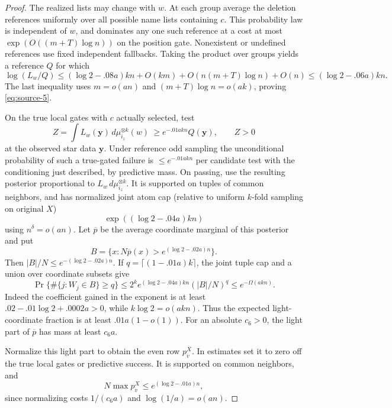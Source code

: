 \begin{proof}
The realized lists may change with \(w\). At each group average the deletion references uniformly over all possible name lists containing \(c\). This probability law is independent of \(w\), and dominates any one such reference at a cost at most \(\exp(O((m+T)\log n))\) on the position gate. Nonexistent or undefined references use fixed independent fallbacks. Taking the product over groups yields a reference \(Q\) for which
\[
 \log(L_w/Q)\le(\log2-.08a)kn
       +O(km)+O(n(m+T)\log n)+O(n)
       \le(\log2-.06a)kn.
\]
The last inequality uses \(m=o(an)\) and \((m+T)\log n=o(ak)\), proving \eqref{eq:source-5}.

On the true local gates with \(c\) actually selected, test
\[
 Z=\int L_w(\boldsymbol y)\,d\mu_{i_z}^{\otimes k}(w)\ \ge e^{-.01 a k n}Q(\boldsymbol y),\qquad Z>0
\]
at the observed star data \(\boldsymbol y\). Under reference odd sampling the unconditional probability of such a true-gated failure is \(\le e^{-.01 a k n}\) per candidate test with the conditioning just described, by predictive mass. On passing, use the resulting posterior proportional to \(L_w\,d\mu_{i_z}^{\otimes k}\). It is supported on tuples of common neighbors, and has normalized joint atom cap (relative to uniform \(k\)-fold sampling on original \(X\))
\[
 \exp((\log 2-.04a)kn)
\]
using \(n^\delta=o(an)\). Let \(\overline p\) be the average coordinate marginal of this posterior and put
\[
 B=\{x:N\overline p(x)>e^{(\log2-.02a)n}\}.
\]
Then \(|B|/N\le e^{-(\log2-.02a)n}\). If \(q=\lceil(1-.01a)k\rceil\), the joint tuple cap and a union over coordinate subsets give
\[
 \Pr\{\#\{j:W_j\in B\}\ge q\}
 \le2^k e^{(\log2-.04a)kn}(|B|/N)^q
 \le e^{-\Omega(akn)}.
\]
Indeed the coefficient gained in the exponent is at least
\(.02-.01\log2+.0002a>0\), while \(k\log2=o(akn)\).
Thus the expected light-coordinate fraction is at least \(.01a(1-o(1))\). For an absolute \(c_6>0\), the light part of \(\overline p\) has mass at least \(c_6a\).

Normalize this light part to obtain the even row \(p_v^X\). In estimates set it to zero off the true local gates or predictive success. It is supported on common neighbors, and
\[
 N\max p_v^X\le e^{(\log2-.01a)n},
\]
since normalizing costs \(1/(c_6a)\) and \(\log(1/a)=o(an)\).


\end{proof}
